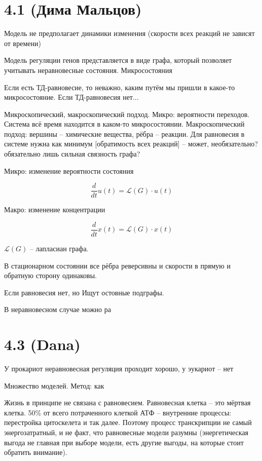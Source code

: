 \documentclass[a4paper,12pt]{article}
\begin{document}
\section{4.1 (Дима Мальцов)}

Модель не предполагает динамики изменения (скорости всех реакций не зависят от времени)

Модель регуляции генов представляется в виде графа, который позволяет учитывать неравновесные состояния.
Микросостояния

Если есть ТД-равновесие, то неважно, каким путём мы пришли в какое-то микросостояние.
Если ТД-равновесия нет...

Микроскопический, макроскопический подход.
Микро: вероятности переходов.
Система всё время находится в каком-то микросостоянии.
Макроскопический подход: вершины -- химические вещества, рёбра -- реакции.
Для равновесия в системе нужна как минимум [обратимость всех реакций] -- может, необязательно? обязательно лишь сильная связность графа?

Микро: изменение вероятности состояния

\[ \frac{d}{dt} u(t) = \mathcal L (G) \cdot u(t) \]

Макро: изменение концентрации

\[ \frac{d}{dt} x(t) = \mathcal L (G) \cdot x(t) \]

$ \mathcal L(G) $ -- лапласиан графа.

В стационарном состоянии все рёбра реверсивны и скорости в прямую и обратную сторону одинаковы.

Если равновесия нет, но %
Ищут остовные подграфы.

В неравновесном случае можно ра

\section{4.3 (Dana)}

У прокариот неравновесная регуляция проходит хорошо, у эукариот -- нет

Множество моделей.
Метод: как

Жизнь в принципе не связана с равновесием.
Равновесная клетка -- это мёртвая клетка.
50\% от всего потраченного клеткой АТФ -- внутренние процессы: перестройка цитоскелета и так далее.
Поэтому процесс транскрипции не самый энергозатратный, и не факт, что равновесные модели разумны (энергетическая выгода не главная при выборе модели, есть другие выгоды, на которые стоит обратить внимание).
\end{document}
